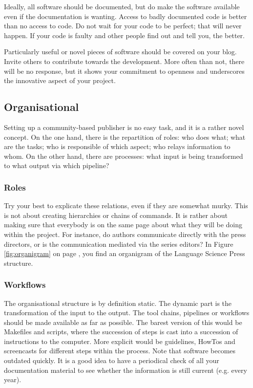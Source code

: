 \documentclass[nonflat,modfonts,output=book] {langsci/langscibook}
\begin{document}
Ideally, all software should be documented, but do make the software available even if the documentation is wanting. Access to badly documented code is better than no access to code. Do not wait for your code to be perfect; that will never happen. If your code is faulty and other people find out and tell you, the better.

Particularly useful or novel pieces of software should be covered on your blog. Invite others to contribute towards the development. More often than not, there will be no response, but it shows your commitment to openness and underscores the innovative aspect of your project. 


\subsection{Organisational}
Setting up a community-based publisher is no easy task, and it is a rather novel concept. On the one hand, there is the repartition of roles: who does what; what are the tasks; who is responsible of which aspect; who relays information to whom. On the other hand, there are processes: what input is being transformed to what output via which pipeline?

\subsubsection{Roles}

Try your best to explicate these relations, even if they are somewhat murky. This is not about creating hierarchies or chains of commands. It is rather about making sure that everybody is on the same page about what they will be doing within the project. For instance, do authors communicate directly with the press directors, or is the communication mediated via the series editors? In Figure \ref{fig:organigram} on page \pageref{fig:organigram}, you find an organigram of the Language Science Press structure. 


\subsubsection{Workflows}
The organisational structure is by definition static. The dynamic part is the transformation of the input to the output. The tool chains, pipelines or workflows should be made available as far as possible. The barest version of this would be Makefiles and scripts, where the succession of steps is cast into a succession of instructions to the computer. More explicit would be guidelines, HowTos and screencasts for different steps within the process. Note that software becomes outdated quickly. It is a good idea to have a periodical check of all your documentation material to see whether the information is still current (e.g. every year). 
\end{document}

